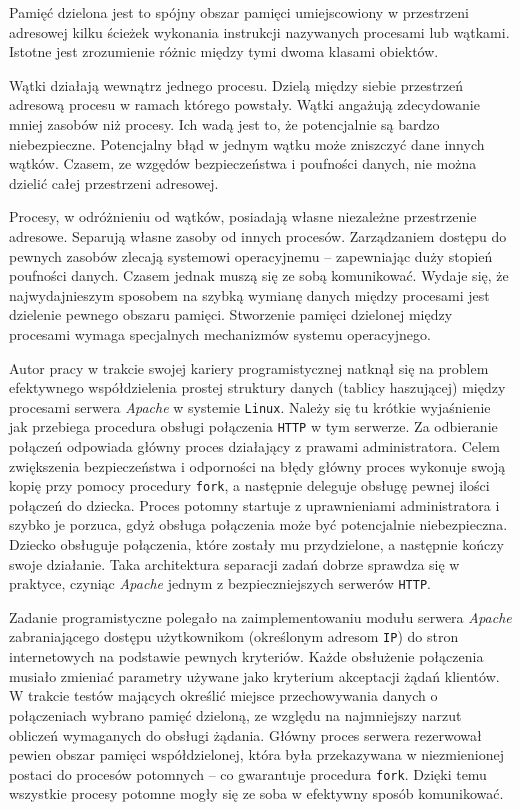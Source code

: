 \documentclass[12pt,a4paper,titlepage,twoside]{mwart}
\begin{document}
Pamięć dzielona jest to spójny obszar pamięci umiejscowiony w przestrzeni
adresowej kilku ścieżek wykonania instrukcji nazywanych procesami lub wątkami.
Istotne jest zrozumienie różnic między tymi dwoma klasami obiektów.

Wątki działają wewnątrz jednego procesu. Dzielą między siebie przestrzeń
adresową procesu w ramach którego powstały. Wątki angażują zdecydowanie mniej
zasobów niż procesy. Ich wadą jest to, że potencjalnie są bardzo niebezpieczne.
Potencjalny błąd w jednym wątku może zniszczyć dane innych wątków. Czasem, ze
wzgędów bezpieczeństwa i poufności danych, nie można dzielić całej przestrzeni
adresowej.

Procesy, w odróżnieniu od wątków, posiadają własne niezależne przestrzenie
adresowe. Separują własne zasoby od innych procesów. Zarządzaniem dostępu do
pewnych zasobów zlecają systemowi operacyjnemu -- zapewniając duży stopień
poufności danych. Czasem jednak muszą się ze sobą komunikować. Wydaje się, że
najwydajnieszym sposobem na szybką wymianę danych między procesami jest
dzielenie pewnego obszaru pamięci. Stworzenie pamięci dzielonej między
procesami wymaga specjalnych mechanizmów systemu operacyjnego.

Autor pracy w trakcie swojej kariery programistycznej natknął się na problem
efektywnego współdzielenia prostej struktury danych (tablicy haszującej) między
procesami serwera \textit{Apache} w systemie \texttt{Linux}.  Należy się tu
krótkie wyjaśnienie jak przebiega procedura obsługi połączenia \verb+HTTP+ w
tym serwerze. Za odbieranie połączeń odpowiada główny proces działający z
prawami administratora. Celem zwiększenia bezpieczeństwa i odporności na błędy
główny proces wykonuje swoją kopię przy pomocy procedury \verb+fork+, a
następnie deleguje obsługę pewnej ilości połączeń do dziecka.  Proces potomny
startuje z uprawnieniami administratora i szybko je porzuca, gdyż obsługa
połączenia może być potencjalnie niebezpieczna. Dziecko obsługuje połączenia,
które zostały mu przydzielone, a następnie kończy swoje działanie.  Taka
architektura separacji zadań dobrze sprawdza się w praktyce, czyniąc
\textit{Apache} jednym z bezpieczniejszych serwerów \texttt{HTTP}.

Zadanie programistyczne polegało na zaimplementowaniu modułu serwera
\textit{Apache} zabraniającego dostępu użytkownikom (określonym adresom
\texttt{IP}) do stron internetowych na podstawie pewnych kryteriów. Każde
obsłużenie połączenia musiało zmieniać parametry używane jako kryterium
akceptacji żądań klientów. W trakcie testów mających określić miejsce
przechowywania danych o połączeniach wybrano pamięć dzieloną, ze względu na
najmniejszy narzut obliczeń wymaganych do obsługi żądania. Główny proces
serwera rezerwował pewien obszar pamięci współdzielonej, która była
przekazywana w niezmienionej postaci do procesów potomnych -- co gwarantuje
procedura \verb+fork+. Dzięki temu wszystkie procesy potomne mogły się ze soba
w efektywny sposób komunikować.
\end{document}
